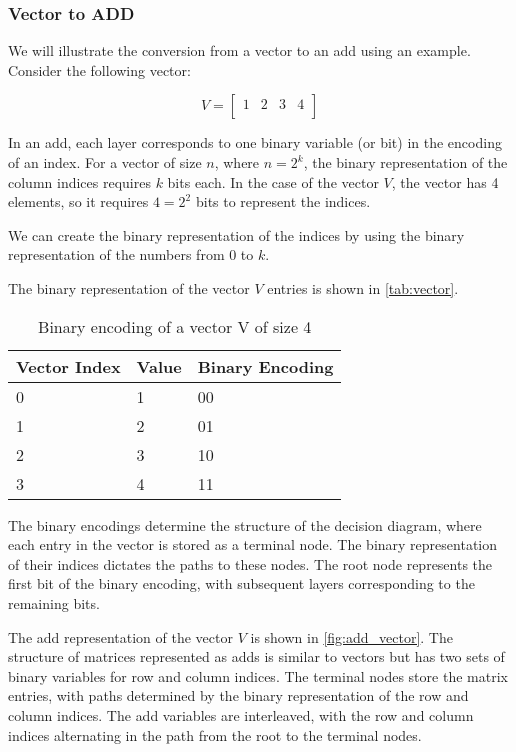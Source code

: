 \subsubsection{Vector to ADD}
We will illustrate the conversion from a vector to an \gls{add} using an example.
Consider the following vector:

\[
    V=
    \begin{bmatrix}
        1 & 2 & 3 & 4 \\
    \end{bmatrix}
\]

In an \gls{add}, each layer corresponds to one binary variable (or bit) in the encoding of an index.
For a vector of size $n$, where $n = 2^k$, the binary representation of the column indices requires $k$ bits each.
In the case of the vector $V$, the vector has 4 elements, so it requires $4 = 2^2$ bits to represent the indices.

We can create the binary representation of the indices by using the binary representation of the numbers from 0 to $k$.

The binary representation of the vector $V$ entries is shown in \autoref{tab:vector}.


\begin{table}[htb!]
    \centering
    \caption{Binary encoding of a vector V of size 4}
    \label{tab:vector}
    \begin{tabular}{lll}
        \toprule
        Vector Index & Value & Binary Encoding \\
        \midrule
        0            & 1     & 00              \\
        1            & 2     & 01              \\
        2            & 3     & 10              \\
        3            & 4     & 11              \\
        \bottomrule
    \end{tabular}
\end{table}


The binary encodings determine the structure of the decision diagram, where each entry in the vector is stored as a terminal node.
The binary representation of their indices dictates the paths to these nodes.
The root node represents the first bit of the binary encoding, with subsequent layers corresponding to the remaining bits.

The \gls{add} representation of the vector $V$ is shown in \autoref{fig:add_vector}.
The structure of matrices represented as \glspl{add} is similar to vectors but has two sets of binary variables for row and column indices.
The terminal nodes store the matrix entries, with paths determined by the binary representation of the row and column indices.
The \gls{add} variables are interleaved, with the row and column indices alternating in the path from the root to the terminal nodes.



